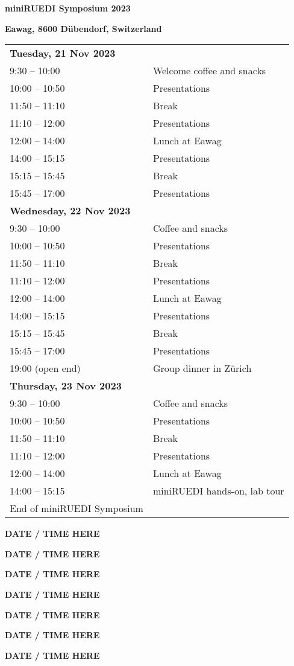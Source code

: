 \documentclass[12pt]{extbook}
\newcommand{\abstract}[2]{{
\begin{center}
\bfseries #1
\end{center}}
\par
}
\begin{document}
\thispagestyle{empty}
\begin{center}

{\LARGE \bf miniRUEDI Symposium 2023}

\bigskip
\bigskip
\bigskip

{\large \bf Eawag, 8600 Dübendorf, Switzerland}

\bigskip
\bigskip
\bigskip
\bigskip
\bigskip
\bigskip

\begin{tabular}{ll}

\multicolumn{2}{l}{\bf Tuesday, 21 Nov 2023}\\[2ex]
9:30  -- 10:00	&	Welcome coffee and snacks\\
10:00 -- 10:50	&	Presentations\\
11:50 -- 11:10	&	Break\\
11:10 -- 12:00	& Presentations\\
12:00 -- 14:00	&	Lunch at Eawag\\
14:00 -- 15:15	&	Presentations\\
15:15 -- 15:45	&	Break\\
15:45 -- 17:00	&	Presentations\\[8ex]

\multicolumn{2}{l}{\bf Wednesday, 22 Nov 2023}\\[2ex]
9:30  -- 10:00	&	Coffee and snacks\\
10:00 -- 10:50	&	Presentations\\
11:50 -- 11:10	&	Break\\
11:10 -- 12:00	& Presentations\\
12:00 -- 14:00	&	Lunch at Eawag\\
14:00 -- 15:15	&	Presentations\\
15:15 -- 15:45	&	Break\\
15:45 -- 17:00	&	Presentations\\
19:00 (open end)	&	Group dinner in Zürich\\[8ex]

\multicolumn{2}{l}{\bf Thursday, 23 Nov 2023}\\[2ex]
9:30  -- 10:00	&	Coffee and snacks\\
10:00 -- 10:50	&	Presentations\\
11:50 -- 11:10	&	Break\\
11:10 -- 12:00	& Presentations\\
12:00 -- 14:00	&	Lunch at Eawag\\
14:00 -- 15:15	&	miniRUEDI hands-on, lab tour\\[1.5ex]

End of miniRUEDI Symposium
\end{tabular}

\end{center}

\clearpage

\abstract{DATE / TIME HERE}{abstracts/Brennwald}
\abstract{DATE / TIME HERE}{abstracts/Engelhardt}
\abstract{DATE / TIME HERE}{abstracts/Mtili}
\abstract{DATE / TIME HERE}{abstracts/Roques}
\abstract{DATE / TIME HERE}{abstracts/vanRooyen}
\abstract{DATE / TIME HERE}{abstracts/Kimani}
\abstract{DATE / TIME HERE}{abstracts/Strauch_Zimmer}
\end{document}

